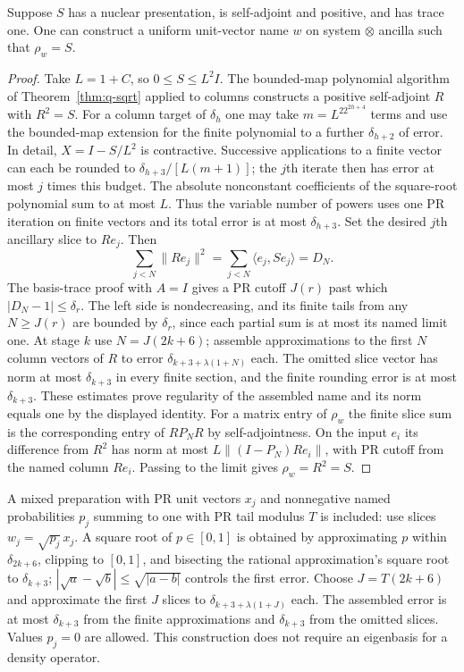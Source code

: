 \begin{theorem}
Suppose $S$ has a nuclear presentation, is self-adjoint and positive,
and has trace one. One can construct a uniform unit-vector name $w$ on
system $\otimes$ ancilla such that $\rho_w=S$.
\end{theorem}
\begin{proof}
Take $L=1+C$, so $0\le S\le L^2I$.
The bounded-map polynomial algorithm of Theorem~\ref{thm:q-sqrt}
applied to columns constructs a positive self-adjoint $R$ with $R^2=S$.
For a column target of $\delta_h$ one may take
$m=L^22^{2h+4}$ terms and use the bounded-map extension for the
finite polynomial to a further $\delta_{h+2}$ of error. In detail, $X=I-S/L^2$ is contractive. Successive applications to a
finite vector can each be rounded to $\delta_{h+3}/[L(m+1)]$; the
$j$th iterate then has error at most $j$ times this budget. The absolute
nonconstant coefficients of the square-root polynomial sum to at most
$L$. Thus the variable number of powers uses one PR iteration on finite
vectors and its total error is at most $\delta_{h+3}$.
Set the desired $j$th ancillary slice to $R e_j$. Then
\[
 \sum_{j<N}\|R e_j\|^2
    =\sum_{j<N}\langle e_j,S e_j\rangle=D_N .
\]
The basis-trace proof with $A=I$ gives a PR cutoff $J(r)$ past which
$|D_N-1|\le\delta_r$. The left side is nondecreasing, and its finite
tails from any $N\ge J(r)$ are bounded by $\delta_r$, since each
partial sum is at most its named limit one. At stage $k$ use
$N=J(2k+6)$; assemble approximations to the first $N$ column vectors
of $R$ to error $\delta_{k+3+\lambda(1+N)}$ each.
The omitted slice vector has norm at most $\delta_{k+3}$ in every
finite section, and the finite rounding error is at most $\delta_{k+3}$.
These estimates prove regularity of the assembled name and its norm
equals one by the displayed identity. For a matrix entry of $\rho_w$
the finite slice sum is the corresponding entry of $R P_N R$ by
self-adjointness. On the input $e_i$ its difference from $R^2$ has
norm at most $L\|(I-P_N)R e_i\|$, with PR cutoff from the named
column $R e_i$. Passing to the limit gives $\rho_w=R^2=S$.
\end{proof}

A mixed preparation with PR unit vectors $x_j$ and nonnegative named
probabilities $p_j$ summing to one with PR tail modulus $T$ is included:
use slices $w_j=\sqrt{p_j}\,x_j$. A square root of $p\in[0,1]$ is
obtained by approximating $p$ within $\delta_{2k+6}$, clipping to
$[0,1]$, and bisecting the rational approximation's square root to
$\delta_{k+3}$; $|\sqrt a-\sqrt b|\le\sqrt{|a-b|}$ controls the
first error. Choose $J=T(2k+6)$ and approximate the first $J$ slices
to $\delta_{k+3+\lambda(1+J)}$ each. The assembled error is at most
$\delta_{k+3}$ from the finite approximations and $\delta_{k+3}$ from
the omitted slices. Values $p_j=0$ are allowed. This construction does
not require an eigenbasis for a density operator.


